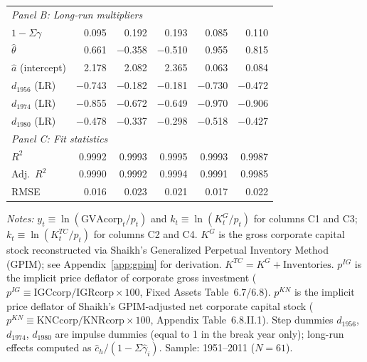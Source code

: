 \begin{table}[H]
\begin{threeparttable}
{\begin{tabular}{lrrrrr}
				\midrule
				\multicolumn{6}{l}{\textit{Panel B: Long-run multipliers}} \\[2pt]
				$1 - \Sigma\gamma$
				&  0.095  &  0.192  &  0.193  &  0.085  &  0.110  \\
				$\hat{\theta}$
				&  0.661  & $-$0.358  & $-$0.510  &  0.955  &  0.815  \\
				$\hat{a}$ (intercept)
				&  2.178  &  2.082  &  2.365  &  0.063  &  0.084  \\[4pt]
				$d_{1956}$ (LR)
				& $-$0.743  & $-$0.182  & $-$0.181  & $-$0.730  & $-$0.472  \\
				$d_{1974}$ (LR)
				& $-$0.855  & $-$0.672  & $-$0.649  & $-$0.970  & $-$0.906  \\
				$d_{1980}$ (LR)
				& $-$0.478  & $-$0.337  & $-$0.298  & $-$0.518  & $-$0.427  \\[4pt]
				\midrule
				\multicolumn{6}{l}{\textit{Panel C: Fit statistics}} \\[2pt]
				$R^2$
				&  0.9992  &  0.9993  &  0.9995  &  0.9993  &  0.9987  \\
				Adj.\ $R^2$
				&  0.9990  &  0.9992  &  0.9994  &  0.9991  &  0.9985  \\
				RMSE
				&  0.016  &  0.023  &  0.021  &  0.017  &  0.022  \\
				\bottomrule
		\end{tabular}}
		\begin{tablenotes}
			\item \textit{Notes:}
			$y_t \equiv \ln(\text{GVAcorp}_t / p_t)$ and
			$k_t \equiv \ln(K^G_t / p_t)$ for columns C1 and C3;
			$k_t \equiv \ln(K^{TC}_t / p_t)$ for columns C2 and C4.
			$K^G$ is the gross corporate capital stock reconstructed via
			Shaikh's Generalized Perpetual Inventory Method (GPIM);
			see Appendix~\ref{app:gpim} for derivation.
			$K^{TC} = K^G + \text{Inventories}$.
			$p^{IG}$ is the implicit price deflator of corporate gross investment
			($p^{IG} \equiv \text{IGCcorp}/\text{IGRcorp} \times 100$,
			Fixed Assets Table~6.7/6.8).
			$p^{KN}$ is the implicit price deflator of Shaikh's GPIM-adjusted
			net corporate capital stock
			($p^{KN} \equiv \text{KNCcorp}/\text{KNRcorp} \times 100$,
			Appendix Table~6.8.II.1).
			Step dummies $d_{1956}$, $d_{1974}$, $d_{1980}$ are impulse dummies
			(equal to 1 in the break year only);
			long-run effects computed as $\hat{c}_h/(1-\Sigma\hat{\gamma}_i)$.
			Sample: 1951--2011 ($N=61$).
		\end{tablenotes}
	\end{threeparttable}
\end{table}



